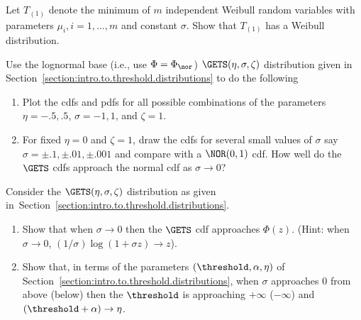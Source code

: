 \begin{exercise}
Let $T_{(1)}$ denote the minimum of $m$ independent Weibull random
variables with parameters $\mu_{i}, i=1, \ldots, m$ and constant
$\sigma$.  Show that $T_{(1)}$ has a Weibull distribution.
\end{exercise}


\begin{exercise1}
Use the lognormal base (i.e.,
use $\Phi=\Phi_{\nor}$) $\GETS(\eta, \sigma, \zeta)$ 
distribution given in Section~\ref{section:intro.to.threshold.distributions}
to do the following
\begin{enumerate}
\item
Plot the cdfs and pdfs for all possible combinations of 
the parameters $\eta=-.5, .5$, $\sigma=-1,1$,
and $\zeta=1$.
\item
For fixed $\eta=0$ and $\zeta=1$, draw the cdfs for several small
values of $\sigma$ say $\sigma=\pm .1, \pm .01, \pm .001$
and compare with a $\NOR(0,1)$ cdf. How well do the
$\GETS$ cdfs approach the normal cdf as $\sigma \to 0$?
\end{enumerate}
\end{exercise1}

\begin{exercise1}
Consider the $\GETS(\eta, \sigma, \zeta)$ 
distribution as given 
in~Section~\ref{section:intro.to.threshold.distributions}. 
\begin{enumerate}
\item
Show that when $\sigma \to 0$ then
the $\GETS$ cdf approaches 
$\Phi(z)$. (Hint: when $\sigma \to 0$, $(1/\sigma) \log(1+ \sigma z) \to z$).
\item
Show that, in terms of the
parameters $(\threshold, \alpha, \eta)$
of Section~\ref{section:intro.to.threshold.distributions},
when $\sigma$ approaches
$0$ from above (below) then
the $\threshold$ is approaching $+\infty$ ($-\infty$) and
$(\threshold+\alpha) \to \eta$.
\end{enumerate}
\end{exercise1}
